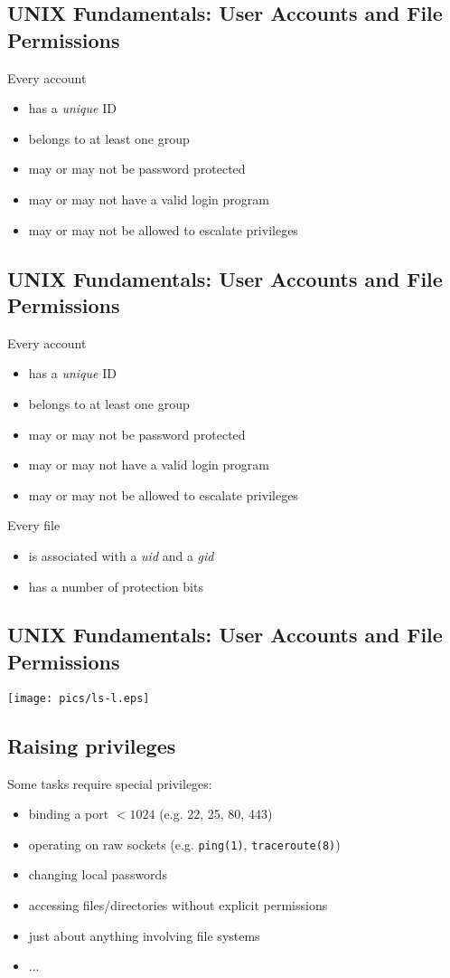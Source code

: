 \documentclass[xga]{xdvislides}
\begin{document}
\subsection{UNIX Fundamentals: User Accounts and File Permissions}
Every account
\begin{itemize}
	\item has a {\em unique} ID
	\item belongs to at least one group
	\item may or may not be password protected
	\item may or may not have a valid login program
	\item may or may not be allowed to escalate privileges
\end{itemize}

\subsection{UNIX Fundamentals: User Accounts and File Permissions}
Every account
\begin{itemize}
	\item has a {\em unique} ID
	\item belongs to at least one group
	\item may or may not be password protected
	\item may or may not have a valid login program
	\item may or may not be allowed to escalate privileges
\end{itemize}
\addvspace{.5in}
Every file
\begin{itemize}
	\item is associated with a {\em uid} and a {\em gid}
	\item has a number of protection bits
\end{itemize}

\subsection{UNIX Fundamentals: User Accounts and File Permissions}
\vfill
\begin{center}
	\texttt{[image: pics/ls-l.eps]}
\end{center}
\vfill

\subsection{Raising privileges}
Some tasks require special privileges:
\begin{itemize}
	\item binding a port $< 1024$ (e.g. 22, 25, 80, 443)
	\item operating on raw sockets (e.g. {\tt ping(1)}, {\tt traceroute(8)})
	\item changing local passwords
	\item accessing files/directories without explicit permissions
	\item just about anything involving file systems
	\item ...
\end{itemize}
\end{document}
